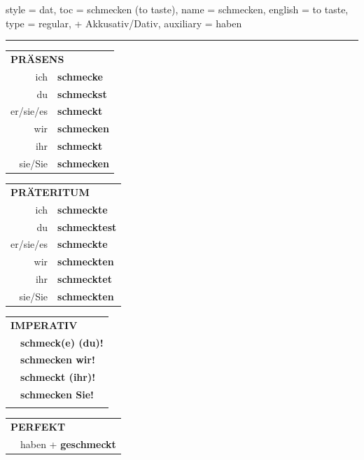 \begin{verbentry}{
  style = {dat},
  toc = {schmecken (to taste)},
  name = {schmecken},
  english = {to taste},
  type = {regular, + Akkusativ/Dativ},
  auxiliary = {haben}
}
 
    
     \vspace{5pt}

    \hrule
    
    \vspace{5pt}

  \begin{tabular}{rl}
     \multicolumn{2}{l}{\textbf{PRÄSENS} }\\
    ich & \textbf{schmecke}\\
    du & \textbf{schmeckst}\\
    er/sie/es & \textbf{schmeckt}\\
    wir & \textbf{schmecken}\\
    ihr & \textbf{schmeckt}\\
    sie/Sie & \textbf{schmecken}\\
  \end{tabular}
  \hfill
     \begin{tabular}{rl}
    \multicolumn{2}{l}{\textbf{PRÄTERITUM} }\\
    ich & \textbf{schmeckte}\\
    du & \textbf{schmecktest}\\
    er/sie/es & \textbf{schmeckte}\\
    wir & \textbf{schmeckten}\\
    ihr & \textbf{schmecktet}\\
    sie/Sie & \textbf{schmeckten}\\
  \end{tabular}
  \hfill
  \begin{tabular}{rl}
     \multicolumn{2}{l}{\textbf{IMPERATIV} }\\
   & \textbf{schmeck(e) (du)!}\\
   & \textbf{schmecken wir!}\\
   & \textbf{schmeckt (ihr)!}\\
   & \textbf{schmecken Sie!}\\
   & \vspace{10pt}
  \end{tabular}

    \vspace{10pt}

 \begin{tabular}{rl}
     \multicolumn{2}{l}{\textbf{PERFEKT}}\\
  &  haben + \textbf{geschmeckt}\\
  \end{tabular}
\hfill
   \begin{tabular}{rl}
   

\end{tabular}
\end{verbentry}
